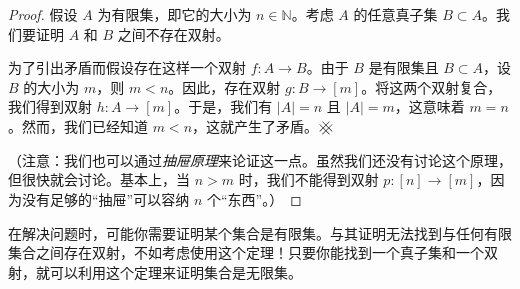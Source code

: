 \begin{proof}
    假设 $A$ 为有限集，即它的大小为 $n \in \mathbb{N}$。考虑 $A$ 的任意真子集 $B \subset A$。我们要证明 $A$ 和 $B$ 之间不存在双射。

    为了引出矛盾而假设存在这样一个双射 $f : A \to B$。由于 $B$ 是有限集且 $B \subset A$，设 $B$ 的大小为 $m$，则 $m < n$。因此，存在双射 $g : B \to [m]$。将这两个双射复合，我们得到双射 $h : A \to [m]$。于是，我们有 $|A| = n$ 且 $|A| = m$，这意味着 $m = n$。然而，我们已经知道 $m < n$，这就产生了矛盾。$\hashx$

    （注意：我们也可以通过\emph{抽屉原理}来论证这一点。虽然我们还没有讨论这个原理，但很快就会讨论。基本上，当 $n > m$ 时，我们不能得到双射 $p:[n] \to [m]$，因为没有足够的``抽屉''可以容纳 $n$ 个``东西''。）
\end{proof}

在解决问题时，可能你需要证明某个集合是有限集。与其证明无法找到与任何有限集合之间存在双射，不如考虑使用这个定理！只要你能找到一个真子集和一个双射，就可以利用这个定理来证明集合是无限集。
